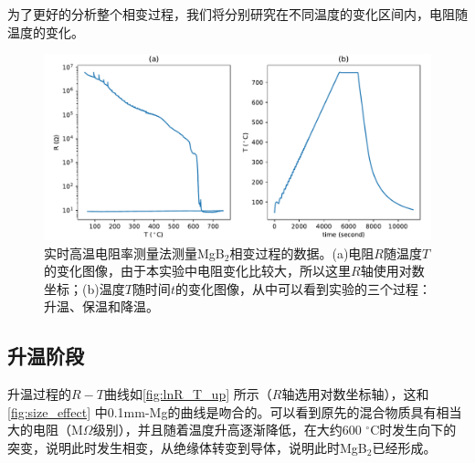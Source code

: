 \documentclass[font=default]{mpltx}
\begin{document}
为了更好的分析整个相变过程，我们将分别研究在不同温度的变化区间内，电阻随温度的变化。
\begin{figure}[h]
  \centering
  \includegraphics[width=0.9\linewidth]{fig/lnR_T_T_t.pdf}
  \caption{实时高温电阻率测量法测量MgB$_2$相变过程的数据。(a)电阻$R$随温度$T$的变化图像，由于本实验中电阻变化比较大，所以这里$R$轴使用对数坐标；(b)温度$T$随时间$t$的变化图像，从中可以看到实验的三个过程：升温、保温和降温。}
  \label{fig:lnR_T_T_t}
\end{figure}
\subsection{升温阶段}\label{sectionA}
升温过程的$R-T$曲线如\autoref{fig:lnR_T_up} 所示（$R$轴选用对数坐标轴），这和\autoref{fig:size_effect} 中0.1mm-Mg的曲线是吻合的。可以看到原先的混合物质具有相当大的电阻（M$\Omega$级别），并且随着温度升高逐渐降低，在大约600 $^\circ$C时发生向下的突变，说明此时发生相变，从绝缘体转变到导体，说明此时MgB$_2$已经形成。
\end{document}
